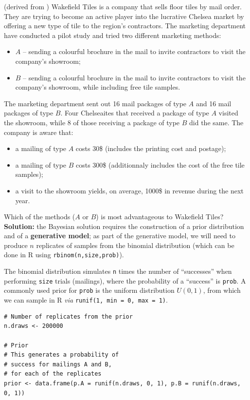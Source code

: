 \begin{Example} (derived from \cite{BDA_N13}) 
Wakefield Tiles is a company that sells floor tiles by mail order. They are trying to become an active player into the lucrative Chelsea market by offering a new type of tile to the region's contractors. The marketing department have conducted a pilot study and tried two different marketing methods:
\begin{itemize}[noitemsep]
	\item $A$ -- sending a colourful brochure in the mail to invite contractors to visit the company's showroom;
	\item $B$ -- sending a colourful brochure in the mail to invite contractors to visit the company's showroom, while including free tile samples.
\end{itemize}
The marketing department sent out 16 mail packages of type $A$ and 16 mail packages of type $B$. Four Chelseaites that received a package of type $A$ visited the showroom, while 8 of those receiving a package of type $B$ did the same. The company is aware that: 
\begin{itemize}[noitemsep]
\item a mailing of type $A$ costs 30\$ (includes the printing cost and postage);
\item a mailing of type $B$ costs 300\$ (additionnaly includes the cost of the free tile samples);
\item a visit to the showroom yields, on average, 1000\$ in revenue during the next year.
\end{itemize}
Which of the methods ($A$ or $B$) is most advantageous to Wakefield Tiles? \newl
\textbf{Solution:} the Bayesian solution requires the construction of a prior distribution and of a \textbf{generative model}; as part of the generative model, we will need to produce $n$ replicates of samples from the binomial distribution (which can be done in R using \texttt{rbinom(n,size,prob)}). \par The binomial distribution simulates \texttt{n} times the number of ``successes'' when performing \texttt{size} trials (mailings), where the probability of a ``success'' is \texttt{prob}.  A commonly used prior for \texttt{prob} is the uniform distribution $U(0,1)$, from which we can sample in R \textit{via} \texttt{runif(1, min = 0, max = 1)}.  
\begin{lstlisting}
# Number of replicates from the prior
n.draws <- 200000

# Prior
# This generates a probability of 
# success for mailings A and B, 
# for each of the replicates
prior <- data.frame(p.A = runif(n.draws, 0, 1), p.B = runif(n.draws, 0, 1))


\end{lstlisting}
\end{Example}
